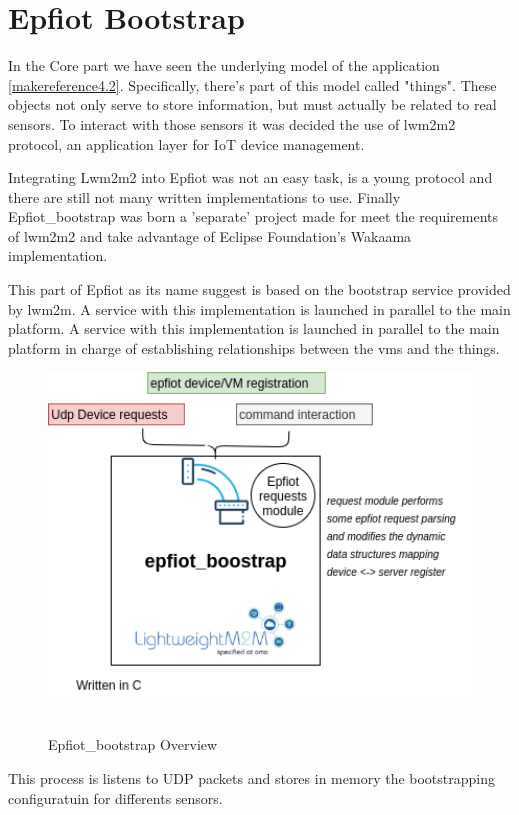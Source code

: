 \section{Epfiot Bootstrap}
\label{makereference4.3}
In the Core part we have seen the underlying model of the application \ref{makereference4.2}. Specifically, there's part of this model called "things".
These objects not only serve to store information, but must actually be related to real sensors. To interact with those sensors it was decided the use of lwm2m2 protocol, an application layer for IoT device management.

Integrating Lwm2m2 into Epfiot was not an easy task, is a young protocol and there are still not many written implementations to use.
Finally Epfiot\_bootstrap was born a 'separate' project made for meet the requirements of lwm2m2 and take advantage of Eclipse Foundation's Wakaama implementation.

This part of Epfiot as its name suggest is based on the bootstrap service provided by lwm2m. A service with this implementation is launched in parallel to the main platform. A service with this implementation is launched in parallel to the main platform in charge of establishing relationships between the vms and the things.

\begin{figure}[h!]%
\centering
    \includegraphics[width=5.0in]{figures/bootstrap.png}
~\caption{Epfiot_bootstrap Overview}
\label{figure4.7}
\end{figure}

This process is listens to UDP packets and stores in memory the bootstrapping configuratuin for differents sensors.
\newpage


